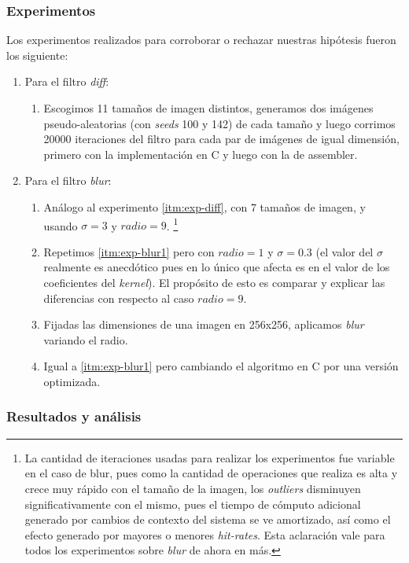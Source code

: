 \subsubsection{Experimentos}
Los experimentos realizados para corroborar o rechazar nuestras hipótesis fueron los siguiente:
\begin{enumerate}
	\item Para el filtro \emph{diff}: 
		\begin{enumerate}
			\item \label{itm:exp-diff} Escogimos 11 tamaños de imagen distintos, generamos dos imágenes pseudo-aleatorias (con \emph{seeds} 100 y 142) de cada tamaño y luego corrimos 20000 iteraciones del filtro para cada par de imágenes de igual dimensión, primero con la implementación en C y luego con la de assembler.
		\end{enumerate}
	\item Para el filtro \emph{blur}:
		\begin{enumerate}
			\item \label{itm:exp-blur1}Análogo al experimento \ref{itm:exp-diff}, con 7 tamaños de imagen, y usando $\sigma=3$ y $radio=9$. \footnote{La cantidad de iteraciones usadas para realizar los experimentos fue variable en el caso de blur, pues como la cantidad de operaciones que realiza es alta y crece muy rápido con el tamaño de la imagen, los \emph{outliers} disminuyen significativamente con el mismo, pues el tiempo de cómputo adicional generado por cambios de contexto del sistema se ve amortizado, así como el efecto generado por mayores o menores \emph{hit-rates}. Esta aclaración vale para todos los experimentos sobre \emph{blur} de ahora en más.}
			\item \label{itm:exp-blur2}Repetimos \ref{itm:exp-blur1} pero con $radio = 1$ y $\sigma = 0.3$ (el valor del $\sigma$ realmente es anecdótico pues en lo único que afecta es en el valor de los coeficientes del \emph{kernel}). El propósito de esto es comparar y explicar las diferencias con respecto al caso $radio = 9$.
			\item \label{itm:exp-blur3}Fijadas las dimensiones de una imagen en 256x256, aplicamos \emph{blur} variando el radio.
			\item \label{itm:exp-blur4}Igual a \ref{itm:exp-blur1} pero cambiando el algoritmo en C por una versión optimizada.
		\end{enumerate}
\end{enumerate}

\subsubsection{Resultados y análisis}

